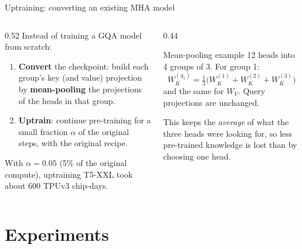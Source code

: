 \documentclass[aspectratio=169,11pt]{beamer}
\begin{document}
\begin{frame}{Uptraining: converting an existing MHA model}
  \begin{columns}[T]
    \begin{column}{0.52\textwidth}
      \small
      Instead of training a GQA model from scratch:
      \begin{enumerate}
        \item \textbf{Convert} the checkpoint: build each group's key (and value) projection by \textbf{mean-pooling} the projections of the heads in that group.
        \item \textbf{Uptrain}: continue pre-training for a small fraction $\alpha$ of the original steps, with the original recipe.
      \end{enumerate}
      \vspace{1mm}
      With $\alpha=0.05$ (5\% of the original compute), uptraining T5-XXL took about 600 TPUv3 chip-days.
    \end{column}
    \begin{column}{0.44\textwidth}
      \begin{exampleblock}{Mean-pooling example}
        \small
        12 heads into 4 groups of 3. For group 1:
        \[
          W_K^{(g_1)}=\tfrac13\big(W_K^{(1)}+W_K^{(2)}+W_K^{(3)}\big)
        \]
        and the same for $W_V$. Query projections are unchanged.
        \vspace{1mm}

        This keeps the \emph{average} of what the three heads were looking for, so less pre-trained knowledge is lost than by choosing one head.
      \end{exampleblock}
    \end{column}
  \end{columns}
\end{frame}

\section{Experiments}
\end{document}
